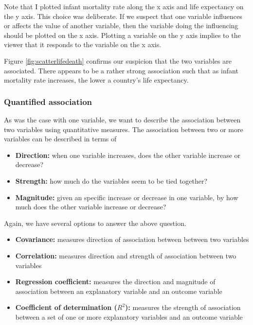 \documentclass[
]{book}
\providecommand{\tightlist}{%
  \setlength{\itemsep}{0pt}\setlength{\parskip}{0pt}}
\begin{document}
Note that I plotted infant mortality rate along the x axis and life expectancy on the y axis. This choice was deliberate. If we suspect that one variable influences or affects the value of another variable, then the variable doing the influencing should be plotted on the x axis. Plotting a variable on the y axis implies to the viewer that it responds to the variable on the x axis.

Figure \ref{fig:scatterlifedeath} confirms our suspicion that the two variables are associated. There appears to be a rather strong association such that as infant mortality rate increases, the lower a country's life expectancy.

\hypertarget{quantified-association}{%
\subsubsection*{Quantified association}\label{quantified-association}}

As was the case with one variable, we want to describe the association between two variables using quantitative measures. The association between two or more variables can be described in terms of

\begin{itemize}
\tightlist
\item
  \textbf{Direction:} when one variable increases, does the other variable increase or decrease?
\item
  \textbf{Strength:} how much do the variables seem to be tied together?
\item
  \textbf{Magnitude:} given an specific increase or decrease in one variable, by how much does the other variable increase or decrease?
\end{itemize}

Again, we have several options to answer the above question.

\begin{itemize}
\tightlist
\item
  \textbf{Covariance:} measures direction of association between between two variables
\item
  \textbf{Correlation:} measures direction and strength of association between two variables
\item
  \textbf{Regression coefficient:} measures the direction and magnitude of association between an explanatory variable and an outcome variable
\item
  \textbf{Coefficient of determination (\(R^2\)):} measures the strength of association between a set of one or more explanatory variables and an outcome variable
\end{itemize}
\end{document}
